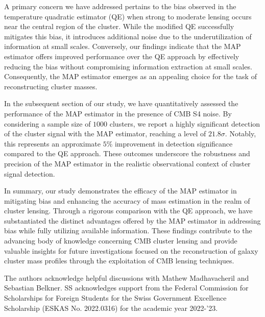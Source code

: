 \documentclass[prd, superscriptaddress, tightenlines, longbibliography, nofootinbib, eqsecnum, amsfonts, amsmath, floatfix, twocolumn, notitlepage]{revtex4-2}
\begin{document}
A primary concern we have addressed pertains to the bias observed in the temperature quadratic estimator (QE) when strong to moderate lensing occurs near the central region of the cluster. While the modified QE successfully mitigates this bias, it introduces additional noise due to the underutilization of information at small scales. Conversely, our findings indicate that the MAP estimator offers improved performance over the QE approach by effectively reducing the bias without compromising information extraction at small scales. Consequently, the MAP estimator emerges as an appealing choice for the task of reconstructing cluster masses.

In the subsequent section of our study, we have quantitatively assessed the performance of the MAP estimator in the presence of CMB S4 noise. By considering a sample size of $1000$ clusters, we report a highly significant detection of the cluster signal with the MAP estimator, reaching a level of $21.8\sigma$. Notably, this represents an approximate $5\%$ improvement in detection significance compared to the QE approach. These outcomes underscore the robustness and precision of the MAP estimator in the realistic observational context of cluster signal detection.

In summary, our study demonstrates the efficacy of the MAP estimator in mitigating bias and enhancing the accuracy of mass estimation in the realm of cluster lensing. Through a rigorous comparison with the QE approach, we have substantiated the distinct advantages offered by the MAP estimator in addressing bias while fully utilizing available information. These findings contribute to the advancing body of knowledge concerning CMB cluster lensing and provide valuable insights for future investigations focused on the reconstruction of galaxy cluster mass profiles through the exploitation of CMB lensing techniques.


\begin{acknowledgements}
The authors acknowledge helpful discussions with Mathew Madhavacheril and Sebastian Belkner. SS acknowledges support from the Federal Commission for Scholarships for Foreign Students for the Swiss Government Excellence Scholarship (ESKAS No. 2022.0316) for the academic year 2022-'23.
\end{acknowledgements}

\appendix
\end{document}
